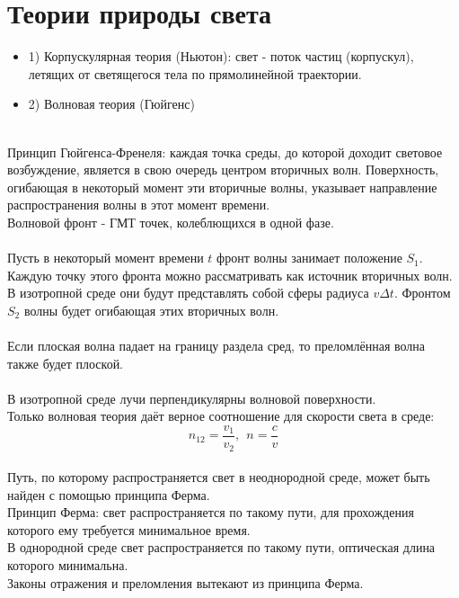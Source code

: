 \documentclass[14pt]{extarticle}
\begin{document}
\section{Теории природы света}
\begin{itemize}
    \item 1) Корпускулярная теория (Ньютон): свет - поток частиц (корпускул),
    летящих от светящегося тела по прямолинейной траектории. 
    \item 2) Волновая теория (Гюйгенс)
\end{itemize}
\ \\
Принцип Гюйгенса-Френеля: каждая точка среды, до которой доходит световое
возбуждение, является в свою очередь центром вторичных волн. Поверхность, 
огибающая в некоторый момент эти вторичные волны, указывает направление 
распространения волны в этот момент времени.\\
Волновой фронт - ГМТ точек, колеблющихся в одной фазе.\\\\
Пусть в некоторый момент времени $t$ фронт волны занимает положение $S_1$. 
Каждую точку этого фронта можно рассматривать как источник вторичных волн.
В изотропной среде они будут представлять собой сферы радиуса $v\Delta t$.
Фронтом $S_2$ волны будет огибающая этих вторичных волн.\\\\
Если плоская волна падает на границу раздела сред, то преломлённая волна 
также будет плоской.\\\\
В изотропной среде лучи перпендикулярны волновой поверхности.\\
Только волновая теория даёт верное соотношение для скорости света в среде:
$$n_{12} =  \frac{v_1}{v_2}, \ \ n = \frac{c}{v}$$\\
Путь, по которому распространяется свет в неоднородной среде,
может быть найден с помощью принципа Ферма.\\
Принцип Ферма: свет распространяется по такому пути, для прохождения
которого ему требуется минимальное время.\\
В однородной среде свет распространяется по такому пути, оптическая длина
которого минимальна.\\
Законы отражения и преломления вытекают из принципа Ферма. 
\end{document}
